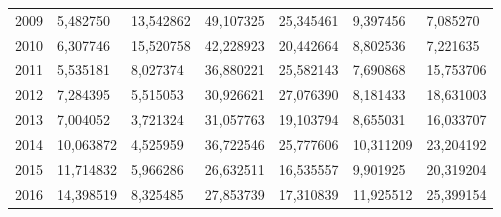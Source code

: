 \begin{table}
\begin{tabular}{p{1cm}p{2cm}p{2cm}p{2cm}p{2cm}p{2cm}p{2cm}}
 2009 &                              5,482750 & 13,542862 &                           49,107325 &         25,345461 &                                    9,397456 &                                           7,085270 \\
 2010 &                              6,307746 & 15,520758 &                           42,228923 &         20,442664 &                                    8,802536 &                                           7,221635 \\
 2011 &                              5,535181 &  8,027374 &                           36,880221 &         25,582143 &                                    7,690868 &                                          15,753706 \\
 2012 &                              7,284395 &  5,515053 &                           30,926621 &         27,076390 &                                    8,181433 &                                          18,631003 \\
 2013 &                              7,004052 &  3,721324 &                           31,057763 &         19,103794 &                                    8,655031 &                                          16,033707 \\
 2014 &                             10,063872 &  4,525959 &                           36,722546 &         25,777606 &                                   10,311209 &                                          23,204192 \\
 2015 &                             11,714832 &  5,966286 &                           26,632511 &         16,535557 &                                    9,901925 &                                          20,319204 \\
 2016 &                             14,398519 &  8,325485 &                           27,853739 &         17,310839 &                                   11,925512 &                                          25,399154 \\
\bottomrule
\end{tabular}
\end{table}
